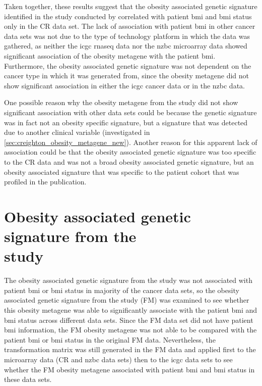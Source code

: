 Taken together, these results suggest that the obesity associated genetic signature identified in the study conducted by \citet{Creighton2012} correlated with patient \gls{bmi} and \gls{bmi} status only in the CR data set.
The lack of association with patient \gls{bmi} in other cancer data sets was not due to the type of technology platform in which the data was gathered, as neither the \gls{icgc} \gls{rnaseq} data nor the \gls{nzbc} microarray data showed significant association of the obesity metagene with the patient \gls{bmi}.
Furthermore, the obesity associated genetic signature was not dependent on the cancer type in which it was generated from, since the obesity metagene did not show significant association in either the \gls{icgc} cancer data or in the \gls{nzbc} data.

One possible reason why the obesity metagene from the \citet{Creighton2012} study did not show significant association with other data sets could be because the genetic signature was in fact not an obesity specific signature, but a signature that was detected due to another clinical variable (investigated in \cref{sec:creighton_obesity_metagene_new}).
Another reason for this apparent lack of association could be that the obesity associated genetic signature was too specific to the CR data and was not a broad obesity associated genetic signature, but an obesity associated signature that was specific to the patient cohort that was profiled in the \citet{Creighton2012} publication.

\section{Obesity associated genetic signature from the\\\citet{Fuentes-Mattei2014} study}
\label{sec:fm_obesity_metagene}

The obesity associated genetic signature from the \citet{Creighton2012} study was not associated with patient \gls{bmi} or \gls{bmi} status in majority of the cancer data sets, so the obesity associated genetic signature from the \citet{Fuentes-Mattei2014} study (FM) was examined to see whether this obesity metagene was able to significantly associate with the patient \gls{bmi} and \gls{bmi} status across different  data sets.
Since the FM data set did not have patient \gls{bmi} information, the FM obesity metagene was not able to be compared with the patient \gls{bmi} or \gls{bmi} status in the original FM data.
Nevertheless, the transformation matrix was still generated in the FM data and applied first to the microarray data (CR and \gls{nzbc} data sets) then to the \gls{icgc} data sets to see whether the FM obesity metagene associated with patient \gls{bmi} and \gls{bmi} status in these data sets.

